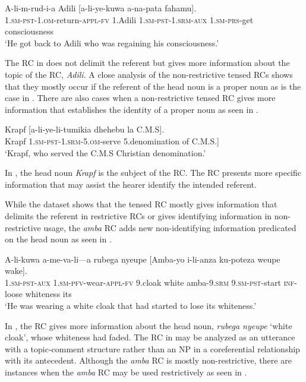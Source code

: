 \documentclass[output=paper,colorlinks,citecolor=brown]{langscibook}
\begin{document}
\ea%
    \label{ex:mwamzandi:15}
    \gll    A-li-m-rud-i-a Adili [a-li-ye-kuwa a-na-pata fahamu].\\
            \textsc{1.sm-pst-1.om-}return\textsc{-appl-fv} 1.Adili \textsc{1.sm-pst-1.srm-aux} \textsc{1.sm-prs-}get consciousness\\
    \glt    ‘He got back to Adili who was regaining his consciousness.’
\z

The RC in  does not delimit the referent but gives more information about the topic of the RC, \textit{Adili}. A close analysis of the non-restrictive tensed RCs shows that they mostly occur if the referent of the head noun is a proper noun as is the case in . There are also cases when a non-restrictive tensed RC gives more information that establishes the identity of a proper noun as seen in .

\ea%
    \label{ex:mwamzandi:16}
    \gll    Krapf [a-li-ye-li-tumikia dhehebu la C.M.S].\\
            Krapf  \textsc{1.sm-pst-1.srm-5.om-}serve 5.denomination of C.M.S.]\\
    \glt    ‘Krapf, who served the C.M.S Christian denomination.’
\z

In , the head noun \textit{Krapf} is the subject of the RC. The RC presents more specific information that may assist the hearer identify the intended referent.

While the dataset shows that the tensed RC mostly gives information that delimits the referent in restrictive RCs or gives identifying information in non-restrictive usage, the \textit{amba} RC adds new non-identifying information predicated on the head noun as seen in .

\ea%
    \label{ex:mwamzandi:17}
    \gll    A-li-kuwa a-me-va-li—a rubega nyeupe [Amba-yo i-li-anza ku-poteza weupe wake].\\
            \textsc{1.sm-pst-aux} \textsc{1.sm-pfv-}wear\textsc{-appl-fv} 9.cloak white amba\textsc{-9.srm} \textsc{9.sm-pst-}start \textsc{inf-}loose whiteness its\\
    \glt    ‘He was wearing a white cloak that had started to lose its whiteness.’
\z

In , the RC gives more information about the head noun, \textit{rubega nyeupe} ‘white cloak’, whose whiteness had faded. The RC in  may be analyzed as an utterance with a topic-comment structure rather than an NP in a coreferential relationship with its antecedent. Although the \textit{amba} RC is mostly non-restrictive, there are instances when the \textit{amba} RC may be used restrictively as seen in .
\end{document}
